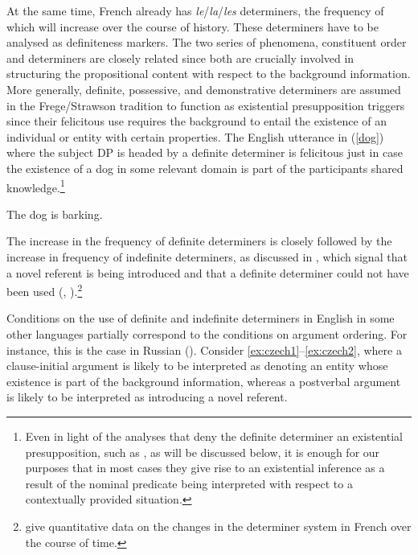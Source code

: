 \documentclass[output=paper,modfonts,nonflat]{langsci/langscibook}
\begin{document}


At the same time, French already has {\it le}/{\it la}/{\it les} determiners, the frequency of which will increase over the course of history. These determiners have to be analysed as definiteness markers. The two series of phenomena, constituent order and determiners are closely related since both are crucially involved in structuring the propositional content with respect to the background information. More generally, definite, possessive, and demonstrative determiners are assumed in the Frege/Strawson tradition to function as existential presupposition triggers since their felicitous use requires the background to entail the existence of an individual or entity with certain properties. The English utterance in (\ref{dog}) where the subject DP is headed by a definite determiner is felicitous just in case the existence of a dog in some relevant domain is part of the participants shared knowledge.\footnote{Even in light of the analyses that deny the definite determiner an existential presupposition, such as \citet{CoppockBeaver:2015}, as will be discussed below, it is enough for our purposes that in most cases they give rise to an existential inference as a result of the nominal predicate being interpreted with respect to a contextually provided situation.} 

\ea \label{dog}
The dog is barking.
\z

The increase in the frequency of definite determiners is closely followed by the increase in frequency of indefinite determiners, as discussed in \citet{Carlier:2013}, which signal that a novel referent is being introduced and that a definite determiner could not have been used (\citet{Heim:1982}, \citet{Heim:1991}).\footnote{\citet{SimonenkoCarlier:review} give quantitative data on the changes in the determiner system in French over the course of time.}

Conditions on the use of definite and indefinite determiners in English in some other languages partially correspond to the conditions on argument ordering. For instance, this is the case in Russian (\citealt{Titov:2012}). Consider \ref{ex:czech1}--\ref{ex:czech2}, where a clause-initial argument is likely to be interpreted as denoting an entity whose existence is part of the background information, whereas a postverbal argument is likely to be interpreted as introducing a novel referent.
\end{document}

